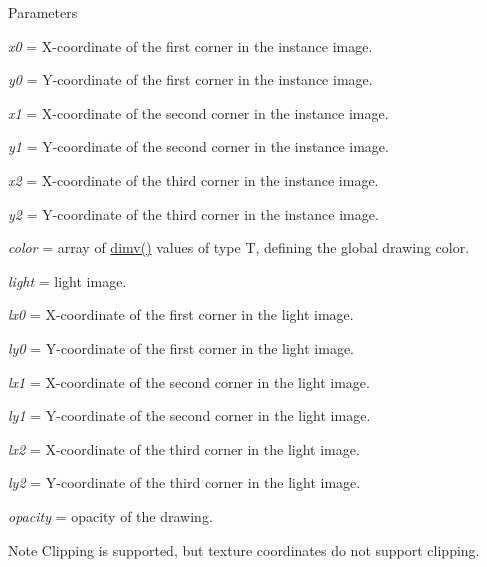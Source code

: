 \begin{DoxyParams}{Parameters}
\item[{\em x0}]= X-\/coordinate of the first corner in the instance image. \item[{\em y0}]= Y-\/coordinate of the first corner in the instance image. \item[{\em x1}]= X-\/coordinate of the second corner in the instance image. \item[{\em y1}]= Y-\/coordinate of the second corner in the instance image. \item[{\em x2}]= X-\/coordinate of the third corner in the instance image. \item[{\em y2}]= Y-\/coordinate of the third corner in the instance image. \item[{\em color}]= array of \hyperlink{structcimg__library_1_1_c_img_ad30f8300f32a94a80e1e06c84a45de49}{dimv()} values of type {\ttfamily T}, defining the global drawing color. \item[{\em light}]= light image. \item[{\em lx0}]= X-\/coordinate of the first corner in the light image. \item[{\em ly0}]= Y-\/coordinate of the first corner in the light image. \item[{\em lx1}]= X-\/coordinate of the second corner in the light image. \item[{\em ly1}]= Y-\/coordinate of the second corner in the light image. \item[{\em lx2}]= X-\/coordinate of the third corner in the light image. \item[{\em ly2}]= Y-\/coordinate of the third corner in the light image. \item[{\em opacity}]= opacity of the drawing. \end{DoxyParams}
\begin{DoxyNote}{Note}
Clipping is supported, but texture coordinates do not support clipping. 
\end{DoxyNote}
